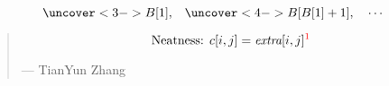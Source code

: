 \begin{frame}{}
  

  \[
    \uncover<3->{B[1],} \quad \uncover<4->{B[B[1] + 1], \quad \cdots}
  \]
\end{frame}

\begin{frame}{}
  \begin{quote}
    \[
      \text{Neatness: } c[i,j] = \text{\it extra}[i,j]^{\textcolor{red}{1}}
    \]

    \hfill --- TianYun Zhang 
  \end{quote}

  \pause
  \vspace{0.20cm}

  \pause
  \begin{center}
  \end{center}
\end{frame}

% 
% 
% 
